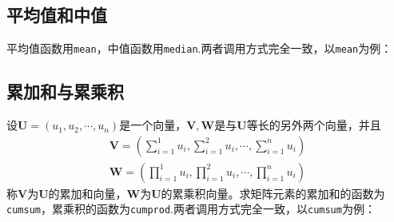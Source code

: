 \subsection{平均值和中值}
平均值函数用\lstinline|mean|，中值函数用\lstinline|median|.两者调用方式完全一致，以\lstinline|mean|为例：
\begin{table}[!htb]
	\centering
\end{table}

\subsection{累加和与累乘积}
设$\bm{U} = (u_1, u_2, \cdots, u_n)$是一个向量，$\bm{V},\bm{W}$是与$\bm{U}$等长的另外两个向量，并且
\begin{align}
	\bm{V} = \left(\sum_{i = 1}^{1} u_i,\sum_{i = 1}^{2} u_i, \cdots ,\sum_{i = 1}^{n} u_i  \right)\\[0.5em]
	\bm{W} = \left(\prod_{i = 1}^{1} u_i,\prod_{i = 1}^{2} u_i, \cdots ,\prod_{i = 1}^{n} u_i  \right)
\end{align}
称$\bm{V}$为$\bm{U}$的累加和向量，$\bm{W}$为$\bm{U}$的累乘积向量。求矩阵元素的累加和的函数为\lstinline|cumsum|，累乘积的函数为\lstinline|cumprod|.两者调用方式完全一致，以\lstinline|cumsum|为例：
\begin{table}[!htb]
	\centering
\end{table}

